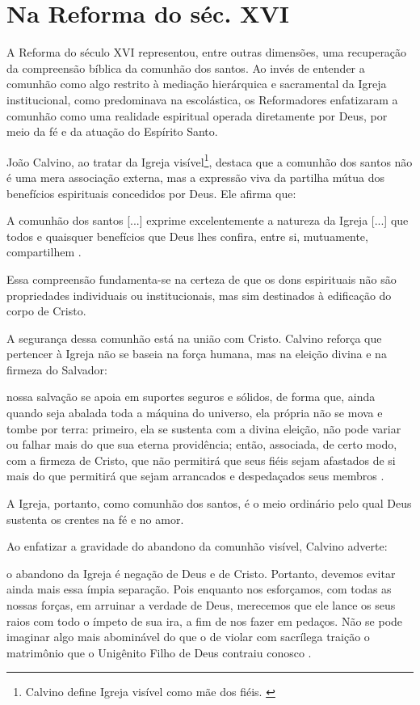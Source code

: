 \section{Na Reforma do séc. XVI}

A Reforma do século XVI representou, entre outras dimensões, uma recuperação da compreensão bíblica da comunhão dos santos. Ao invés de entender a comunhão como algo restrito à mediação hierárquica e sacramental da Igreja institucional, como predominava na escolástica, os Reformadores enfatizaram a comunhão como uma realidade espiritual operada diretamente por Deus, por meio da fé e da atuação do Espírito Santo.

João Calvino, ao tratar da Igreja visível\footnote{Calvino define Igreja visível como mãe dos fiéis. \cite[v.~4, p.~1865]{calvino2022}}, destaca que a comunhão dos santos não é uma mera associação externa, mas a expressão viva da partilha mútua dos benefícios espirituais concedidos por Deus. Ele afirma que:
\begin{citacao}
A comunhão dos santos [...] exprime excelentemente a natureza da Igreja [...] que todos e quaisquer benefícios que Deus lhes confira, entre si, mutuamente, compartilhem \cite[v.~4, p.~1863]{calvino2022}.
\end{citacao}

Essa compreensão fundamenta-se na certeza de que os dons espirituais não são propriedades individuais ou institucionais, mas sim destinados à edificação do corpo de Cristo.

A segurança dessa comunhão está na união com Cristo. Calvino reforça que pertencer à Igreja não se baseia na força humana, mas na eleição divina e na firmeza do Salvador:
\begin{citacao}
nossa salvação se apoia em suportes seguros e sólidos, de forma que, ainda quando seja abalada toda a máquina do universo, ela própria não se mova e tombe por terra: primeiro, ela se sustenta com a divina eleição, não pode variar ou falhar mais do que sua eterna providência; então, associada, de certo modo, com a firmeza de Cristo, que não permitirá que seus fiéis sejam afastados de si mais do que permitirá que sejam arrancados e despedaçados seus membros \cite[v.~4, pp.~1863-1864]{calvino2022}.
\end{citacao}

A Igreja, portanto, como comunhão dos santos, é o meio ordinário pelo qual Deus sustenta os crentes na fé e no amor.

Ao enfatizar a gravidade do abandono da comunhão visível, Calvino adverte:
\begin{citacao}
o abandono da Igreja é negação de Deus e de Cristo. Portanto, devemos evitar ainda mais essa ímpia separação. Pois enquanto nos esforçamos, com todas as nossas forças, em arruinar a verdade de Deus, merecemos que ele lance os seus raios com todo o ímpeto de sua ira, a fim de nos fazer em pedaços. Não se pode imaginar algo mais abominável do que o de violar com sacrílega traição o matrimônio que o Unigênito Filho de Deus contraiu conosco \cite[v.~4, pp.~1877-1878]{calvino2022}.
\end{citacao}

